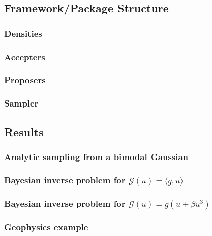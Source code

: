 \documentclass[11pt]{article}
\newcommand{\G}[1]{{\mathcal{G} \left( #1 \right)}}
\begin{document}
\subsection{Framework/Package Structure}
\label{sec:org969ba4c}
\subsubsection{Densities}
\label{sec:org93b86ad}
\subsubsection{Accepters}
\label{sec:org8d9fdf3}
\subsubsection{Proposers}
\label{sec:orga5ced13}
\subsubsection{Sampler}
\label{sec:org2e96f24}
\subsection{Results}
\label{sec:orgb7d32b4}
\subsubsection{Analytic sampling from a bimodal Gaussian}
\label{sec:orga0cb869}
\subsubsection{Bayesian inverse problem for \(\G{u} = \langle g,u \rangle\)}
\label{sec:org2ceb4e5}
\subsubsection{Bayesian inverse problem for \(\G{u} = g (u + \beta u^3)\)}
\label{sec:orge8cc32f}
\subsubsection{Geophysics example}
\label{sec:org86457d4}







\end{document}
